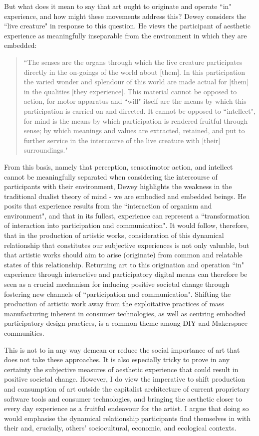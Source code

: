 But what does it mean to say that art ought to originate and operate ``in" experience, and how might these movements address this? Dewey considers the ``live creature" in response to this question. He views the participant of aesthetic experience as meaningfully inseparable from the environment in which they are embedded: 
\begin{quote}
    ``The senses are the organs through which the live creature participates directly in the on-goings of the world about [them]. In this participation the varied wonder and splendour of this world are made actual for [them] in the qualities [they experience]. This material cannot be opposed to action, for motor apparatus and ``will" itself are the means by which this participation is carried on and directed. It cannot be opposed to ``intellect", for mind is the means by which participation is rendered fruitful through sense; by which meanings and values are extracted, retained, and put to further service in the intercourse of the live creature with [their] surroundings." \citeyearpar[p. 22]{dewey1934}
\end{quote}
From this basis, namely that perception, sensorimotor action, and intellect cannot be meaningfully separated when considering the intercourse of participants with their environment, Dewey highlights the weakness in the traditional dualist theory of mind -  we are embodied and embedded beings. He posits that experience results from the ``interaction of organism and environment",  and that in its fullest, experience can represent a ``transformation of interaction into participation and communication". It would follow, therefore, that in the production of artistic works, consideration of this dynamical relationship that constitutes our subjective experiences is not only valuable, but that artistic works should aim to arise (originate) from common and relatable states of this relationship.  Returning art to this origination and operation ``in" experience through interactive and participatory digital means can therefore be seen as a crucial mechanism for inducing positive societal change through fostering new channels of ``participation and communication". Shifting the production of artistic work away from the exploitative practices of mass manufacturing inherent in consumer technologies, as well as centring embodied participatory design practices, is a common theme among DIY and Makerspace communities.

This is not to in any way demean or reduce the social importance of art that does not take these approaches. It is also especially tricky to prove in any certainty the subjective measures of aesthetic experience that could result in positive societal change. However, I do view the imperative to shift production and consumption of art outside the capitalist architecture of current proprietary software tools and consumer technologies, and bringing the aesthetic closer to every day experience as a fruitful endeavour for the artist. I argue that doing so would emphasise the dynamical relationship participants find themselves in with their and, crucially, others' sociocultural, economic, and ecological contexts.

